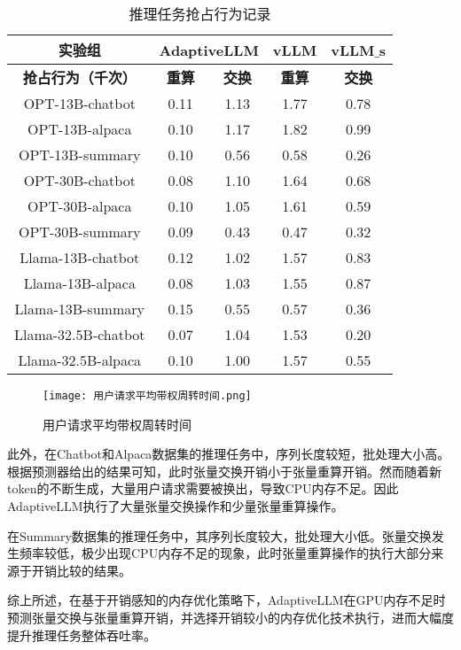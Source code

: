 \begin{table}[H]
  \centering
  \caption{推理任务抢占行为记录}
  \label{Table:推理任务抢占行为记录}
  \renewcommand{\arraystretch}{1.25}
  \small
  \begin{tabular}{c c c c c}
    \toprule
    \textbf{实验组} & \multicolumn{2}{c}{\textbf{AdaptiveLLM}} & \textbf{vLLM} & \textbf{vLLM$\_$s} \\
    \midrule
    \textbf{抢占行为（千次）} & \textbf{重算} & \textbf{交换} & \textbf{重算} & \textbf{交换} \\
    \midrule
    OPT-13B-chatbot & 0.11 & 1.13 & 1.77 & 0.78 \\
    OPT-13B-alpaca & 0.10 & 1.17 & 1.82 & 0.99 \\
    OPT-13B-summary & 0.10 & 0.56 & 0.58 & 0.26 \\
    OPT-30B-chatbot & 0.08 & 1.10 & 1.64 & 0.68 \\
    OPT-30B-alpaca & 0.10 & 1.05 & 1.61 & 0.59 \\
    OPT-30B-summary & 0.09 & 0.43 & 0.47 & 0.32 \\
    Llama-13B-chatbot & 0.12 & 1.02 & 1.57 & 0.83 \\
    Llama-13B-alpaca & 0.08 & 1.03 & 1.55 & 0.87 \\
    Llama-13B-summary & 0.15 & 0.55 & 0.57 & 0.36 \\
    Llama-32.5B-chatbot & 0.07 & 1.04 & 1.53 & 0.20 \\
    Llama-32.5B-alpaca & 0.10 & 1.00 & 1.57 & 0.55 \\
    \bottomrule
  \end{tabular}
\end{table}

\begin{figure*}[!htbp]
  \centering
  \texttt{[image: 用户请求平均带权周转时间.png]}
  \caption{用户请求平均带权周转时间}
  \label{Fig:平均带权周转时间}
\end{figure*}

此外，在Chatbot和Alpaca数据集的推理任务中，序列长度较短，批处理大小高。根据预测器给出的结果可知，此时张量交换开销小于张量重算开销。然而随着新token的不断生成，大量用户请求需要被换出，导致CPU内存不足。因此AdaptiveLLM执行了大量张量交换操作和少量张量重算操作。

在Summary数据集的推理任务中，其序列长度较大，批处理大小低。张量交换发生频率较低，极少出现CPU内存不足的现象，此时张量重算操作的执行大部分来源于开销比较的结果。

综上所述，在基于开销感知的内存优化策略下，AdaptiveLLM在GPU内存不足时预测张量交换与张量重算开销，并选择开销较小的内存优化技术执行，进而大幅度提升推理任务整体吞吐率。 

